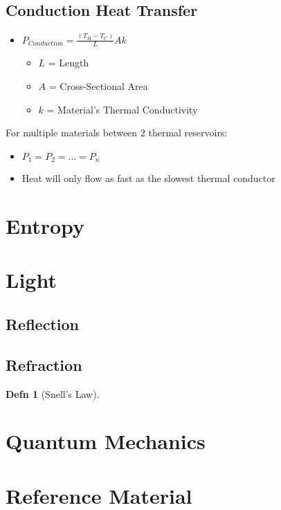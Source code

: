 \documentclass[10pt,letterpaper,final,twoside,notitlepage]{article}
\numberwithin{equation}{section} %
\theoremstyle{definition}
\newtheorem{definition}{Defn}
\begin{document}
	\subsection*{Conduction Heat Transfer} \label{subsec:Conduction Heat Transfer}
	\begin{itemize}[noitemsep, nolistsep]
		\item $P_{Conduction} = \frac{\left( T_{H} - T_{C} \right)}{L} Ak$
		\begin{itemize}[noitemsep, nolistsep]
			\item $L$ = Length
			\item $A$ = Cross-Sectional Area
			\item $k$ = Material's Thermal Conductivity
		\end{itemize}
	\end{itemize}
	For multiple materials between 2 thermal reservoirs:
	\begin{itemize}[noitemsep, nolistsep]
		\item $P_{1} = P_{2} = \ldots = P_{n}$
		\item Heat will only flow as fast as the slowest thermal conductor
	\end{itemize}

\section{Entropy} \label{sec:Entropy}

\section{Light} \label{sec:Light}
	\subsection{Reflection} \label{subsec:Reflection}
	\subsection{Refraction} \label{subsec:Refraction}
		\begin{definition}[Snell's Law] \label{def:Snell's Law}
			
		\end{definition}

\section{Quantum Mechanics} \label{sec:Quantum Mech}

\appendix
\section{Reference Material} \label{sec:Reference Material}


\end{document}
